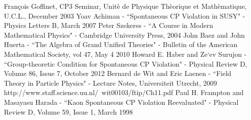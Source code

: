 \documentclass[floatfix,aps,prd,amsmath,amssymb]{revtex4}
\begin{document}
\begin{thebibliography}{10}
Fran\c{c}ois Goffinet, CP3 Seminar, Unit\`{e} de Physique Th\`{e}orique et Math\`{e}matique, U.C.L., December 2003
Yoav Achiman -  ``Spontaneous CP Violation in SUSY" - Physics Letters B, March 2007
Peter Szekeres - ``A Course in Modern Mathematical Physics" - Cambridge University Press, 2004
John Baez and John Huerta - ``The Algebra of Grand Unified Theories" - Bulletin of the American Mathematical Society, vol 47, May 4 2010
Howard E. Haber and Ze`ev Surujon - ``Group-theoretic Condition for Spontaneous CP Violation" - Physical Review D, Volume 86, Issue 7, October 2012
Bernard de Wit and Eric Laenen - ``Field Theory in Particle Physics" - Lecture Notes, Universiteit Utrecht, 2009 http://www.staff.science.uu.nl/~wit00103/ftip/Ch11.pdf
Paul H. Frampton and Masayasu Harada - ``Kaon Spontaneous CP Violation Reevaluated" - Physical Review D, Volume 59, Issue 1, March 1998

\end{thebibliography}
\end{document}
